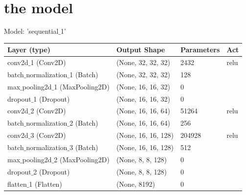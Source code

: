 \documentclass[a4paper,12pt]{report}
\begin{document}
\section{the model}
\begin{center}
	Model: 'sequential$\_$1'
\begin{tabular}{|l l l l|}\hline
	\hline
	Layer (type)                  & Output Shape       & Parameters & Act\\ \hline \hline
	conv2d$\_$1 (Conv2D)             & (None, 32, 32, 32)    & 2432  & relu\\ \hline
	batch$\_$normalization$\_$1 (Batch) & (None, 32, 32, 32)    & 128   &\\ \hline
	max$\_$pooling2d$\_$1 (MaxPooling2D) & (None, 16, 16, 32)    & 0   &\\ \hline
	dropout$\_$1 (Dropout) & (None, 16, 16, 32)    & 0   &\\ \hline
	conv2d$\_$2 (Conv2D)             & (None, 16, 16, 64)    & 51264   & relu\\ \hline
	batch$\_$normalization$\_$2 (Batch) & (None, 16, 16, 64)    & 256  & \\ \hline
	conv2d$\_$3 (Conv2D) & (None, 16, 16, 128)    & 204928   & relu \\ \hline
	batch$\_$normalization$\_$3 (Batch) & (None, 16, 16, 128)    & 512  & \\ \hline
	max$\_$pooling2d$\_$2 (MaxPooling2D) & (None, 8, 8, 128)    & 0  & \\ \hline
	dropout$\_$2 (Dropout) & (None, 8, 8, 128)    & 0   &\\ \hline
	flatten$\_$1 (Flatten) & (None, 8192)    & 0   &\\ \hline

\end{tabular}
\end{center}
\end{document}
